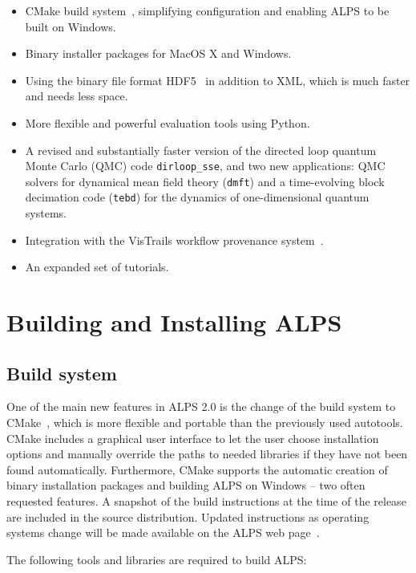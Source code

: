 \documentclass[12pt]{iopart}
\begin{document}
 
 \begin{itemize}
\item CMake build system~\cite{cmake}, simplifying configuration and enabling ALPS to be built on  Windows.
\item Binary installer packages for MacOS X and Windows.
\item Using the binary file format HDF5~\cite{hdf5} in addition to XML, which is much faster and needs less space.
\item More flexible and powerful evaluation tools using Python.
\item A revised and substantially faster version of the directed loop quantum Monte Carlo (QMC) code {\tt dirloop\_sse}, and two new applications: QMC solvers for dynamical 
mean field theory ({\tt dmft}) and a time-evolving block decimation code ({\tt tebd}) for the dynamics of one-dimensional quantum systems.
\item Integration with the VisTrails workflow provenance system~\cite{vistrails}.
\item An expanded set of tutorials.
 \end{itemize}
 
 
\section{Building and Installing ALPS}
\subsection{Build system}
One of the main new features in ALPS 2.0 is the change of the build system to CMake~\cite{cmake}, which is more flexible and portable than the previously used autotools. CMake includes a graphical user interface to let the user choose installation options and manually override the paths to needed libraries if they have not been found automatically.  Furthermore, CMake supports the automatic creation of binary installation packages and building ALPS on Windows -- two often requested features. A snapshot of the build instructions at the time of the release are included in the source distribution. Updated instructions as operating systems change will be made available on the ALPS web page~\cite{alps}.

The following tools and libraries are required to build ALPS:
\end{document}
